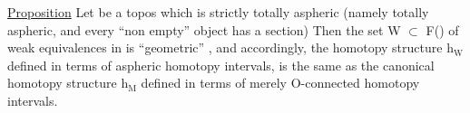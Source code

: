 \uline{Proposition}  Let  be a topos which is strictly totally aspheric
(namely totally aspheric,  and every ``non empty'' object has a section)\hand{:}
 Then the set W $\subset$ F()  of weak equivalences in  is ``geometric'' ,  and
accordingly,  the homotopy structure h$_{\mathrm{W}}$  defined in terms of aspheric
homotopy intervals,  is the same as the canonical homotopy structure h$_{\mathrm{M}}$
defined in terms of merely O-connected homotopy intervals.  

